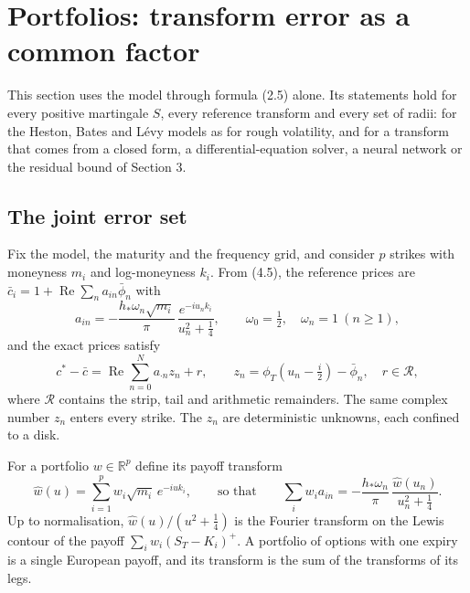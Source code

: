 \documentclass[11pt,a4paper]{article}
\begin{document}
\setcounter{section}{4}\section{Portfolios: transform error as a common factor}

This section uses the model through formula (2.5) alone. Its statements hold for every positive martingale \(S\), every reference transform and every set of radii: for the Heston, Bates and Lévy models as for rough volatility, and for a transform that comes from a closed form, a differential-equation solver, a neural network or the residual bound of Section 3.

\setcounter{subsection}{0}\subsection{The joint error set}

Fix the model, the maturity and the frequency grid, and consider \(p\) strikes with moneyness \(m_i\) and log-moneyness \(k_i\). From (4.5), the reference prices are \(\bar c_i=1+\operatorname{Re}\sum_na_{in}\bar\phi_n\) with
\begin{equation*}\tag{5.1}
a_{in}=-\frac{h_*\omega_n\sqrt{m_i}}{\pi}\,\frac{e^{-iu_nk_i}}{u_n^2+\frac14},\qquad\omega_0=\tfrac12,\quad\omega_n=1\ (n\ge1),
\end{equation*}
and the exact prices satisfy
\begin{equation*}\tag{5.2}
c^*-\bar c=\operatorname{Re}\sum_{n=0}^Na_{\cdot n}z_n+r,\qquad z_n=\phi_T(u_n-\tfrac i2)-\bar\phi_n,\quad r\in\mathcal R,
\end{equation*}
where \(\mathcal R\) contains the strip, tail and arithmetic remainders. The same complex number \(z_n\) enters every strike. The \(z_n\) are deterministic unknowns, each confined to a disk.

For a portfolio \(w\in\mathbb R^p\) define its payoff transform
\begin{equation*}\tag{5.3}
\widehat w(u)=\sum_{i=1}^pw_i\sqrt{m_i}\,e^{-iuk_i},\qquad\text{so that}\qquad
\sum_iw_ia_{in}=-\frac{h_*\omega_n}{\pi}\,\frac{\widehat w(u_n)}{u_n^2+\frac14} .
\end{equation*}
Up to normalisation, \(\widehat w(u)/(u^2+\tfrac14)\) is the Fourier transform on the Lewis contour of the payoff \(\sum_iw_i(S_T-K_i)^+\). A portfolio of options with one expiry is a single European payoff, and its transform is the sum of the transforms of its legs.
\end{document}
